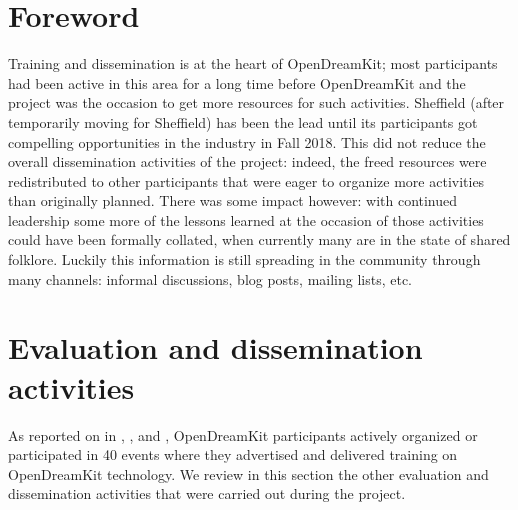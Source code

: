 \documentclass{deliverablereport}
\author{Mike Croucher, Hans Fanghor and Nicolas M. Thiéry}
\begin{document}
\maketitle
\enlargethispage{.5cm}
\githubissuedescription
\clearpage
\tableofcontents


\section*{Foreword}

Training and dissemination is at the heart of OpenDreamKit; most
participants had been active in this area for a long time before
OpenDreamKit and the project was the occasion to get more resources
for such activities. Sheffield (after temporarily moving for
Sheffield) has been the lead until its participants got compelling
opportunities in the industry in Fall 2018. This did not reduce the
overall dissemination activities of the project: indeed, the freed
resources were redistributed to other participants that were eager to
organize more activities than originally planned. There was some
impact however: with continued leadership some more of the lessons
learned at the occasion of those activities could have been formally
collated, when currently many are in the state of shared folklore.
Luckily this information is still spreading in the community through
many channels: informal discussions, blog posts, mailing lists, etc.

\section{Evaluation and dissemination activities}

As reported on in ,
, and ,
OpenDreamKit participants actively organized or participated in 40
events where they advertised and delivered training on OpenDreamKit
technology. We review in this section the other evaluation and
dissemination activities that were carried out during the project.



\end{document}
